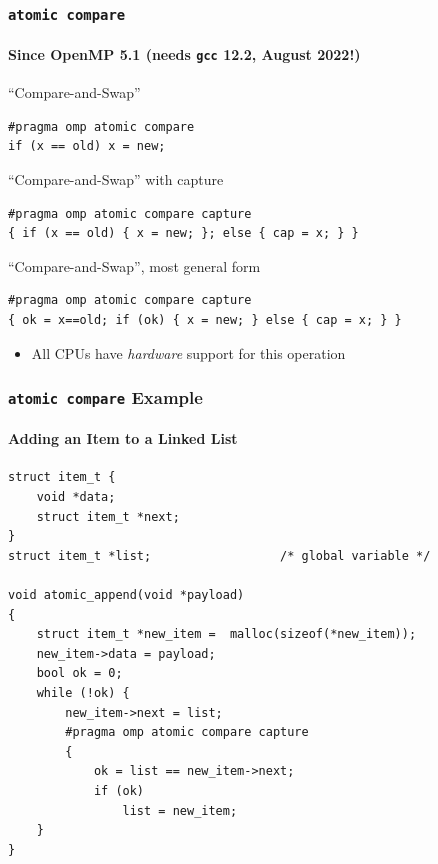 \documentclass{beamer}
\begin{document}

\begin{frame}[fragile=singleslide]
  \frametitle{\texttt{atomic compare}}
  \framesubtitle{Since OpenMP 5.1 (needs \texttt{gcc} 12.2, August 2022!)} 

  \begin{exampleblock}{``Compare-and-Swap''}
\vspace*{-2ex}
\begin{verbatim}
#pragma omp atomic compare
if (x == old) x = new; 
\end{verbatim}
  \end{exampleblock}

  \begin{block}{``Compare-and-Swap'' with capture}
\vspace*{-2ex}
\begin{verbatim}
#pragma omp atomic compare capture
{ if (x == old) { x = new; }; else { cap = x; } }
\end{verbatim}
  \end{block}
  
  \begin{alertblock}{``Compare-and-Swap'', most general form}
\vspace*{-2ex}
\begin{verbatim}
#pragma omp atomic compare capture 
{ ok = x==old; if (ok) { x = new; } else { cap = x; } }
\end{verbatim}
  \end{alertblock}

  \begin{itemize}
  \item All CPUs have \emph{hardware} support for this operation
  \end{itemize}
\end{frame}

  
\begin{frame}[fragile, label=CAS_list]
  \frametitle{\texttt{atomic compare} Example}
  \framesubtitle{Adding an Item to a Linked List}

\begin{verbatim}
struct item_t {
    void *data;
    struct item_t *next;
}
struct item_t *list;                  /* global variable */

void atomic_append(void *payload)
{
    struct item_t *new_item =  malloc(sizeof(*new_item));
    new_item->data = payload;
    bool ok = 0;
    while (!ok) {
        new_item->next = list;
        #pragma omp atomic compare capture
        {
            ok = list == new_item->next;
            if (ok)
                list = new_item;
    }
}
\end{verbatim}
\end{frame}
\end{document}
